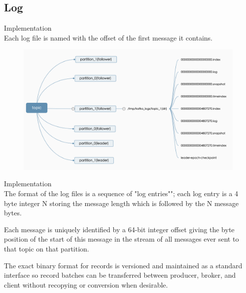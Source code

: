 \subsection{Log}
\begin{frame}[plain,t]{Implementation} %
     \\
    \vspace{2ex}
     Each log file is named with the offset of the first message it contains.
    \begin{figure}
        \centering
        \includegraphics[width=0.9\linewidth]{image/0220}
        \label{fig:0220}
    \end{figure}
    
    
    
\end{frame}

\begin{frame}[plain,t]{Implementation} %
     \\
    \vspace{2ex}
  The format of the log files is a sequence of "log entries""; 
  each log entry is a 4 byte integer N storing the message length which is followed by the N message bytes. 
  
  \vspace{2ex}
  Each message is uniquely identified by a 64-bit integer offset giving the byte position of the start of this message in the stream of all messages ever sent to that topic on that partition.
    
    
     \vspace{2ex}
     The exact binary format for records is versioned and maintained as a standard interface so record batches can be transferred between producer, broker, and client without recopying or conversion when desirable.
    
    
    
\end{frame}

